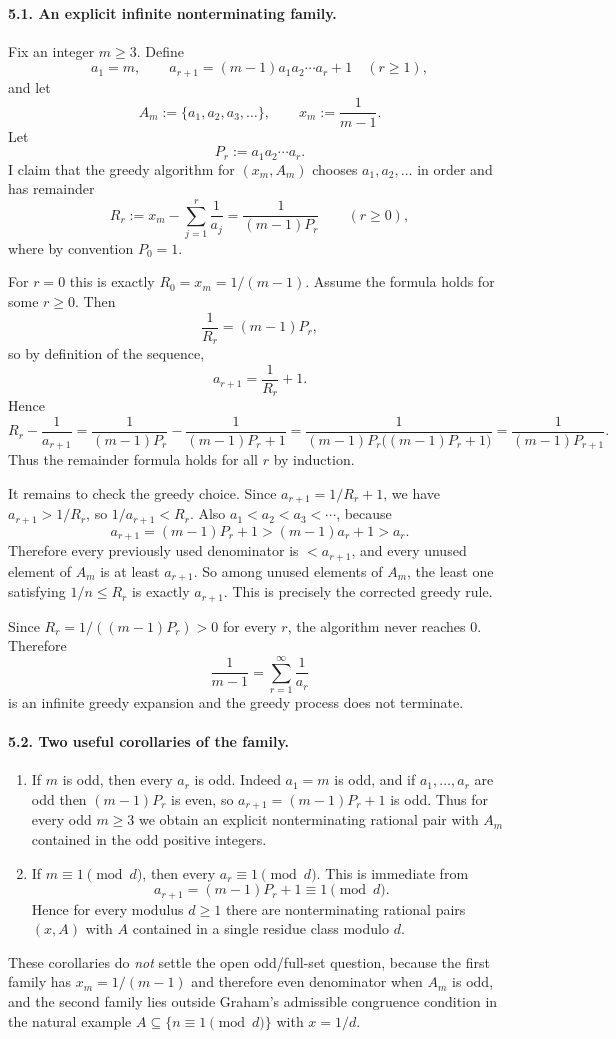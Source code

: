 \paragraph{5.1. An explicit infinite nonterminating family.}
Fix an integer $m\ge 3$. Define
\[
 a_1=m,\qquad a_{r+1}=(m-1)a_1a_2\cdots a_r+1\quad (r\ge 1),
\]
and let
\[
 A_m:=\{a_1,a_2,a_3,\dots\},\qquad x_m:=\frac1{m-1}.
\]
Let
\[
 P_r:=a_1a_2\cdots a_r.
\]
I claim that the greedy algorithm for $(x_m,A_m)$ chooses $a_1,a_2,\dots$ in order and has remainder
\[
R_r:=x_m-\sum_{j=1}^r \frac1{a_j}=\frac1{(m-1)P_r}\qquad (r\ge 0),
\]
where by convention $P_0=1$.

For $r=0$ this is exactly $R_0=x_m=1/(m-1)$. Assume the formula holds for some $r\ge 0$. Then
\[
 \frac1{R_r}=(m-1)P_r,
\]
so by definition of the sequence,
\[
 a_{r+1}=\frac1{R_r}+1.
\]
Hence
\[
 R_r-\frac1{a_{r+1}}
 =\frac1{(m-1)P_r}-\frac1{(m-1)P_r+1}
 =\frac1{(m-1)P_r\bigl((m-1)P_r+1\bigr)}
 =\frac1{(m-1)P_{r+1}}.
\]
Thus the remainder formula holds for all $r$ by induction.

It remains to check the greedy choice. Since $a_{r+1}=1/R_r+1$, we have $a_{r+1}>1/R_r$, so $1/a_{r+1}<R_r$. Also $a_1<a_2<a_3<\cdots$, because
\[
 a_{r+1}=(m-1)P_r+1>(m-1)a_r+1>a_r.
\]
Therefore every previously used denominator is $<a_{r+1}$, and every unused element of $A_m$ is at least $a_{r+1}$. So among unused elements of $A_m$, the least one satisfying $1/n\le R_r$ is exactly $a_{r+1}$. This is precisely the corrected greedy rule.

Since $R_r=1/((m-1)P_r)>0$ for every $r$, the algorithm never reaches $0$. Therefore
\[
 \frac1{m-1}=\sum_{r=1}^{\infty}\frac1{a_r}
\]
is an infinite greedy expansion and the greedy process does not terminate.

\paragraph{5.2. Two useful corollaries of the family.}
\begin{enumerate}
\item If $m$ is odd, then every $a_r$ is odd. Indeed $a_1=m$ is odd, and if $a_1,\dots,a_r$ are odd then $(m-1)P_r$ is even, so $a_{r+1}=(m-1)P_r+1$ is odd. Thus for every odd $m\ge 3$ we obtain an explicit nonterminating rational pair with $A_m$ contained in the odd positive integers.
\item If $m\equiv 1\pmod d$, then every $a_r\equiv 1\pmod d$. This is immediate from
\[
 a_{r+1}=(m-1)P_r+1\equiv 1\pmod d.
\]
Hence for every modulus $d\ge 1$ there are nonterminating rational pairs $(x,A)$ with $A$ contained in a single residue class modulo $d$.
\end{enumerate}
These corollaries do \emph{not} settle the open odd/full-set question, because the first family has $x_m=1/(m-1)$ and therefore even denominator when $A_m$ is odd, and the second family lies outside Graham's admissible congruence condition in the natural example $A\subseteq\{n\equiv 1\pmod d\}$ with $x=1/d$.


